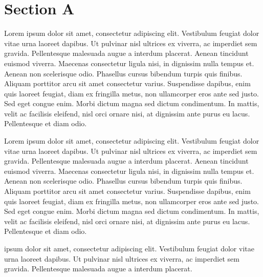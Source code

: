\documentclass{article}
\begin{document}
\section{Section A}

\beginnumbering  
\pstart  
Lorem ipsum dolor sit amet, consectetur adipiscing elit. Vestibulum feugiat dolor vitae urna laoreet dapibus. Ut pulvinar nisl ultrices ex viverra, ac imperdiet sem gravida. Pellentesque malesuada augue a interdum placerat. Aenean tincidunt euismod viverra. Maecenas consectetur ligula nisi, in dignissim nulla tempus et. Aenean non scelerisque odio. Phasellus cursus bibendum turpis quis finibus. Aliquam porttitor arcu sit amet consectetur varius. Suspendisse dapibus, enim quis laoreet feugiat, diam ex fringilla metus, non ullamcorper eros ante sed justo. Sed eget congue enim. Morbi dictum magna sed dictum condimentum. In mattis, velit ac facilisis eleifend, nisl orci ornare nisi, at dignissim ante purus eu lacus. Pellentesque et diam odio.
\pend  
\pausenumbering

\begin{pairs}
\begin{Leftside} 
\resumenumbering  
\pstart  
Lorem ipsum dolor sit amet, consectetur adipiscing elit. Vestibulum feugiat dolor vitae urna laoreet dapibus. Ut pulvinar nisl ultrices ex viverra, ac imperdiet sem gravida. Pellentesque malesuada augue a interdum placerat. Aenean tincidunt euismod viverra. Maecenas consectetur ligula nisi, in dignissim nulla tempus et. Aenean non scelerisque odio. Phasellus cursus bibendum turpis quis finibus. Aliquam porttitor arcu sit amet consectetur varius. Suspendisse dapibus, enim quis laoreet feugiat, diam ex fringilla metus, non ullamcorper eros ante sed justo. Sed eget congue enim. Morbi dictum magna sed dictum condimentum. In mattis, velit ac facilisis eleifend, nisl orci ornare nisi, at dignissim ante purus eu lacus. Pellentesque et diam odio.
\pend  
\pausenumbering 
\end{Leftside}

\begin{Rightside}   
\beginnumbering  
\pstart  
{} ipsum dolor sit amet, consectetur adipiscing elit. Vestibulum feugiat dolor vitae urna laoreet dapibus. Ut pulvinar nisl ultrices ex viverra, ac imperdiet sem gravida. Pellentesque malesuada augue a interdum placerat. 
\pend  
\endnumbering
\end{Rightside}  
\end{pairs}  
\Columns
\end{document}
